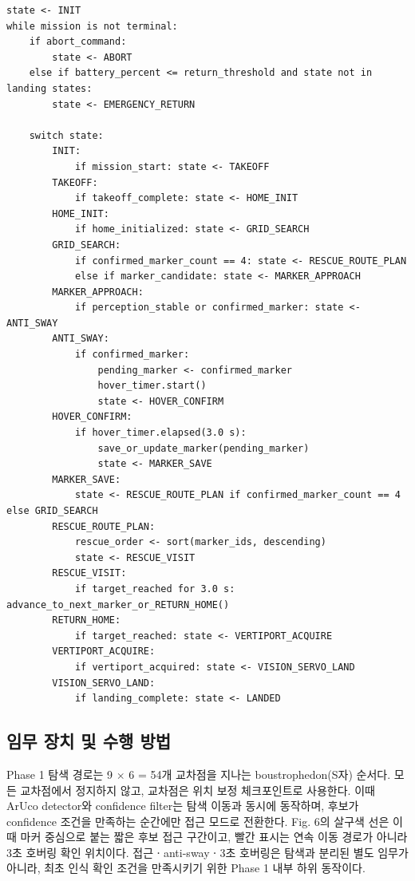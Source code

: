 \documentclass[10pt,a4paper]{article}
\begin{document}
\begin{lstlisting}[style=pseudo,caption={Mission manager pseudocode matching the implemented state machine},label={lst:mission}]
state <- INIT
while mission is not terminal:
    if abort_command:
        state <- ABORT
    else if battery_percent <= return_threshold and state not in landing states:
        state <- EMERGENCY_RETURN

    switch state:
        INIT:
            if mission_start: state <- TAKEOFF
        TAKEOFF:
            if takeoff_complete: state <- HOME_INIT
        HOME_INIT:
            if home_initialized: state <- GRID_SEARCH
        GRID_SEARCH:
            if confirmed_marker_count == 4: state <- RESCUE_ROUTE_PLAN
            else if marker_candidate: state <- MARKER_APPROACH
        MARKER_APPROACH:
            if perception_stable or confirmed_marker: state <- ANTI_SWAY
        ANTI_SWAY:
            if confirmed_marker:
                pending_marker <- confirmed_marker
                hover_timer.start()
                state <- HOVER_CONFIRM
        HOVER_CONFIRM:
            if hover_timer.elapsed(3.0 s):
                save_or_update_marker(pending_marker)
                state <- MARKER_SAVE
        MARKER_SAVE:
            state <- RESCUE_ROUTE_PLAN if confirmed_marker_count == 4 else GRID_SEARCH
        RESCUE_ROUTE_PLAN:
            rescue_order <- sort(marker_ids, descending)
            state <- RESCUE_VISIT
        RESCUE_VISIT:
            if target_reached for 3.0 s: advance_to_next_marker_or_RETURN_HOME()
        RETURN_HOME:
            if target_reached: state <- VERTIPORT_ACQUIRE
        VERTIPORT_ACQUIRE:
            if vertiport_acquired: state <- VISION_SERVO_LAND
        VISION_SERVO_LAND:
            if landing_complete: state <- LANDED
\end{lstlisting}

\subsection{임무 장치 및 수행 방법}

Phase 1 탐색 경로는 9 $\times$ 6 = 54개 교차점을 지나는 boustrophedon(S자) 순서다. 모든 교차점에서 정지하지 않고, 교차점은 위치 보정 체크포인트로 사용한다. 이때 ArUco detector와 confidence filter는 탐색 이동과 동시에 동작하며, 후보가 confidence 조건을 만족하는 순간에만 접근 모드로 전환한다. Fig. 6의 살구색 선은 이때 마커 중심으로 붙는 짧은 후보 접근 구간이고, 빨간 표시는 연속 이동 경로가 아니라 3초 호버링 확인 위치이다. 접근ㆍanti-swayㆍ3초 호버링은 탐색과 분리된 별도 임무가 아니라, 최초 인식 확인 조건을 만족시키기 위한 Phase 1 내부 하위 동작이다.
\end{document}
